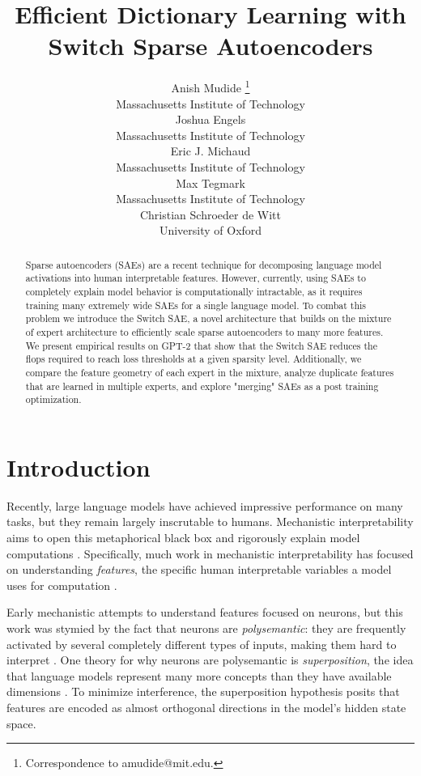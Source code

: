 \documentclass{article} %
\title{Efficient Dictionary Learning with Switch Sparse Autoencoders}
\author{Anish Mudide \thanks{ Correspondence to amudide@mit.edu.} \\
Massachusetts Institute of Technology\\
\And
Joshua Engels \\
Massachusetts Institute of Technology\\
\And
Eric J. Michaud \\
Massachusetts Institute of Technology\\
\And
Max Tegmark \\
Massachusetts Institute of Technology\\
\AND
Christian Schroeder de Witt\\
University of Oxford\\
}
\begin{document}
\maketitle

\begin{abstract}
Sparse autoencoders (SAEs) are a recent technique for decomposing language model activations into human interpretable features. However, currently, using SAEs to completely explain model behavior is computationally intractable, as it requires training many extremely wide SAEs for a single language model. To combat this problem we introduce the Switch SAE, a novel architecture that builds on the mixture of expert architecture to efficiently scale sparse autoencoders to many more features. We present empirical results on GPT-2 that show that the Switch SAE reduces the flops required to reach loss thresholds at a given sparsity level. Additionally, we compare the feature geometry of each expert in the mixture, analyze duplicate features that are learned in multiple experts, and explore "merging" SAEs as a post training optimization.

\end{abstract}

\section{Introduction}
Recently, large language models have achieved impressive performance on many tasks, but they remain largely inscrutable to humans. Mechanistic interpretability aims to open this metaphorical black box and rigorously explain model computations \citep{olah2020zoom}. Specifically, much work in mechanistic interpretability has focused on understanding \textit{features}, the specific human interpretable variables a model uses for computation \citep{olah2020zoom, linear_representation_hypothesis, engels2024not}.  

Early mechanistic attempts to understand features focused on neurons, but this work was stymied by the fact that neurons are \textit{polysemantic}: they are frequently activated by several completely different types of inputs, making them hard to interpret \citep{olah2020zoom}. One theory for why neurons are polysemantic is \textit{superposition}, the idea that language models represent many more concepts than they have available dimensions \citep{elhage2022superposition}. To minimize interference, the superposition hypothesis posits that features are encoded as almost orthogonal directions in the model's hidden state space. 
\end{document}
